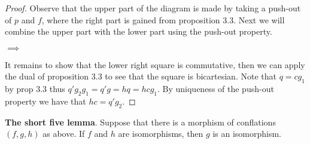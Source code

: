     \begin{proof}
        Observe that the upper part of the diagram is made by taking a push-out of $p$ and $f$, where the right part is gained from proposition 3.3. Next we will combine the upper part with the lower part using the push-out property.
        \begin{center}
             $\implies$
        \end{center}
        It remains to show that the lower right square is commutative, then we can apply the dual of proposition 3.3 to see that the square is bicartesian. Note that $q=cg_1$ by prop 3.3 thus $q'g_2g_1=q'g=hq=hcg_1$. By uniqueness of the push-out property we have that $hc=q'g_2$.
    \end{proof}

    \begin{corollary}
        \textbf{The short five lemma}. Suppose that there is a morphism of conflations $(f,g,h)$ as above. If $f$ and $h$ are isomorphisms, then $g$ is an isomorphism.
    \end{corollary}

